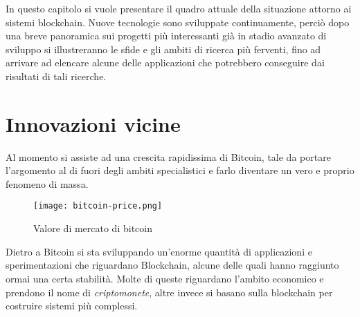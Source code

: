 In questo capitolo si vuole presentare il quadro attuale della situazione attorno ai sistemi blockchain. Nuove tecnologie sono sviluppate continuamente, perciò dopo una breve panoramica sui progetti più interessanti già in stadio avanzato di sviluppo si illustreranno le sfide e gli ambiti di ricerca più ferventi, fino ad arrivare ad elencare alcune delle applicazioni che potrebbero conseguire dai risultati di tali ricerche.

\section{Innovazioni vicine}
    Al momento si assiste ad una crescita rapidissima di Bitcoin, tale da portare l'argomento al di fuori degli ambiti specialistici e farlo diventare un vero e proprio fenomeno di massa.
    \begin{figure}[ht]
        \centering
        \texttt{[image: bitcoin-price.png]}
        \caption{Valore di mercato di bitcoin}
        \label{fig:bitcoin_price}
    \end{figure}
    Dietro a Bitcoin si sta sviluppando un'enorme quantità di applicazioni e sperimentazioni che riguardano Blockchain, alcune delle quali hanno raggiunto ormai una certa stabilità. Molte di queste riguardano l'ambito economico e prendono il nome di \emph{criptomonete}, altre invece si basano sulla blockchain per costruire sistemi più complessi.
